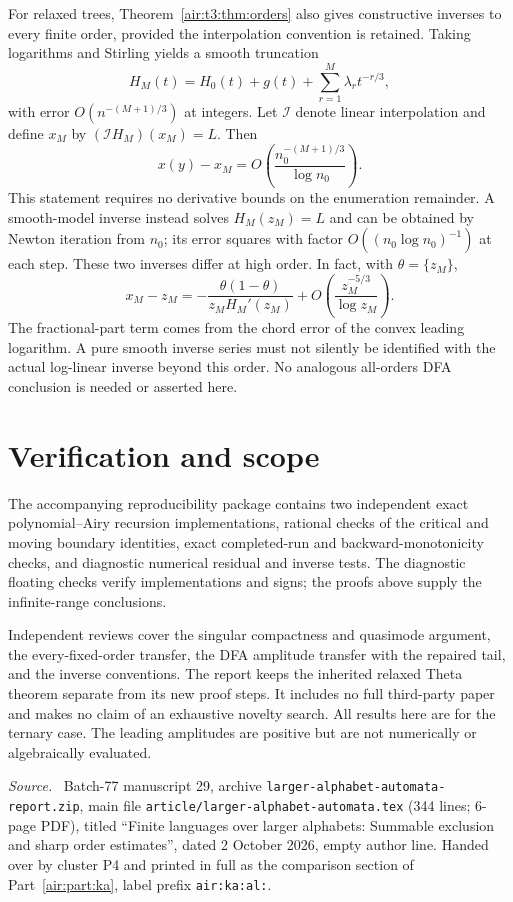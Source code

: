 \documentclass[11pt,letterpaper]{article}
\numberwithin{equation}{section}
\theoremstyle{remark}
\newenvironment{partsource}{\par\medskip\noindent\begin{minipage}{\linewidth}\small\raggedright\textit{Source.}\ }{\end{minipage}\par\medskip}
\newcommand{\repopath}[1]{\nolinkurl{#1}}
\begin{document}
For relaxed trees, Theorem~\ref{air:t3:thm:orders} also gives constructive inverses to every finite order, provided the interpolation convention is retained. Taking logarithms and Stirling yields a smooth truncation
\[
H_M(t)=H_0(t)+g(t)+\sum_{r=1}^M\lambda_r t^{-r/3},
\]
with error $O(n^{-(M+1)/3})$ at integers. Let $\mathcal I$ denote linear interpolation and define $x_M$ by $(\mathcal I H_M)(x_M)=L$. Then
\[
x(y)-x_M=O\left(\frac{n_0^{-(M+1)/3}}{\log n_0}\right).
\]
This statement requires no derivative bounds on the enumeration remainder. A smooth-model inverse instead solves $H_M(z_M)=L$ and can be obtained by Newton iteration from $n_0$; its error squares with factor $O((n_0\log n_0)^{-1})$ at each step. These two inverses differ at high order. In fact, with $\theta=\{z_M\}$,
\[
x_M-z_M=-\frac{\theta(1-\theta)}{z_M H_M'(z_M)}
+O\left(\frac{z_M^{-5/3}}{\log z_M}\right).
\]
The fractional-part term comes from the chord error of the convex leading logarithm. A pure smooth inverse series must not silently be identified with the actual log-linear inverse beyond this order. No analogous all-orders DFA conclusion is needed or asserted here.

\section{Verification and scope}\label{air:t3:sec:verification}
The accompanying reproducibility package contains two independent exact polynomial--Airy recursion implementations, rational checks of the critical and moving boundary identities, exact completed-run and backward-monotonicity checks, and diagnostic numerical residual and inverse tests. The diagnostic floating checks verify implementations and signs; the proofs above supply the infinite-range conclusions.

Independent reviews cover the singular compactness and quasimode argument, the every-fixed-order transfer, the DFA amplitude transfer with the repaired tail, and the inverse conventions. The report keeps the inherited relaxed Theta theorem separate from its new proof steps. It includes no full third-party paper and makes no claim of an exhaustive novelty search. All results here are for the ternary case. The leading amplitudes are positive but are not numerically or algebraically evaluated.

\bigskip{}\par\nopagebreak
\begin{partsource}
Batch-77 manuscript 29, archive \repopath{larger-alphabet-automata-report.zip}, main file \repopath{article/larger-alphabet-automata.tex} (344 lines; 6-page PDF), titled ``Finite languages over larger alphabets: Summable exclusion and sharp order estimates'', dated 2 October 2026, empty author line. Handed over by cluster P4 and printed in full as the comparison section of Part~\ref{air:part:ka}, label prefix \texttt{air:ka:al:}.
\end{partsource}
\end{document}
